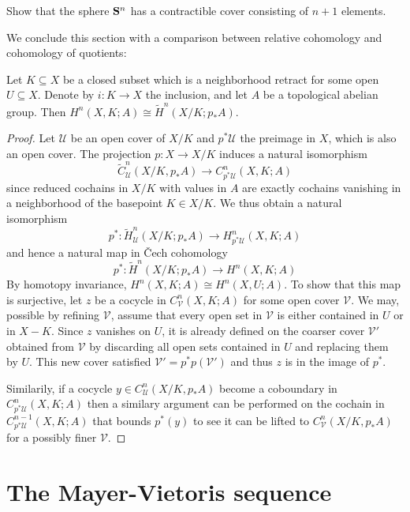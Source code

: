\documentclass[a4paper,openany]{scrbook}
\begin{document}
\begin{exer}
Show that the sphere $\S^n$ has a contractible cover consisting of $n+1$ elements.
\end{exer}

We conclude this section with a comparison between relative cohomology and cohomology of quotients:

\begin{lemma}\label{lemma:cohomologyofquotient}
Let $K \subseteq X$ be a closed subset which is a neighborhood retract for some open $U \subseteq X$. Denote by $i\colon K \to X$ the inclusion, and let $A$ be a topological abelian group. 
Then $H^n(X,K;A) \cong \tilde H^n(X/K;p_*A)$.
\end{lemma}
\begin{proof}

Let $\mathcal U$ be an open cover of $X/K$ and $p^*\mathcal U$ the preimage in $X$, which is also an open cover. The projection $p\colon X \to X/K$ induces a natural isomorphism
\[
\tilde C^n_{\mathcal U}(X/K,p_*A) \to C^n_{p^*\mathcal U}(X,K;A)
\]
since reduced cochains in $X/K$ with values in $A$ are exactly cochains vanishing in a neighborhood of the basepoint $K \in X/K$. We thus obtain a natural isomorphism
\[
p^*\colon \tilde H_{\mathcal U}^n(X/K;p_*A) \to H^n_{p^*\mathcal U}(X,K;A)
\]
and hence a natural map in \v Cech cohomology
\[
p^*\colon \tilde H^n(X/K;p_*A) \to H^n(X,K;A)
\]
By homotopy invariance, $H^n(X,K;A) \cong H^n(X,U;A)$. To show that this map is surjective, let $z$ be a cocycle in $C^n_{\mathcal V}(X,K;A)$ for some open cover $\mathcal V$. We may, possible by refining $\mathcal V$, assume that every open set in $\mathcal V$ is either contained in $U$ or in $X-K$. Since $z$ vanishes on $U$, it is already defined on the coarser cover $\mathcal V'$ obtained from $\mathcal V$ by discarding all open sets contained in $U$ and replacing them by $U$. This new cover satisfied $\mathcal V' = p^*p(\mathcal V')$ and thus $z$ is in the image of $p^*$.

Similarily, if a cocycle $y \in C^n_{\mathcal U}(X/K,p_*A)$ become a coboundary in $C^n_{p^*\mathcal U}(X,K;A)$ then a similary argument can be performed on the cochain in $C^{n-1}_{p^*\mathcal U}(X,K;A)$ that bounds $p^*(y)$ to see it can be lifted to $C^n_{\mathcal V}(X/K,p_*A)$ for a possibly finer $\mathcal V$.
\end{proof}



\section{The Mayer-Vietoris sequence}
\end{document}
